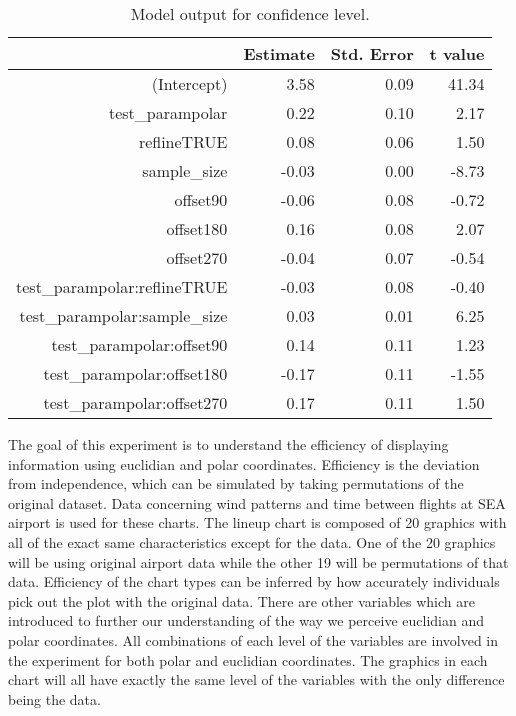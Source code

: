 \begin{table}[ht]
\begin{center}
\resizebox{\linewidth}{!} {
\begin{tabular}{rrrr}
  \hline
 & Estimate & Std. Error & t value \\ 
  \hline
(Intercept) & 3.58 & 0.09 & 41.34 \\ 
  test\_parampolar & 0.22 & 0.10 & 2.17 \\ 
  reflineTRUE & 0.08 & 0.06 & 1.50 \\ 
  sample\_size & -0.03 & 0.00 & -8.73 \\ 
  offset90 & -0.06 & 0.08 & -0.72 \\ 
  offset180 & 0.16 & 0.08 & 2.07 \\ 
  offset270 & -0.04 & 0.07 & -0.54 \\ 
  test\_parampolar:reflineTRUE & -0.03 & 0.08 & -0.40 \\ 
  test\_parampolar:sample\_size & 0.03 & 0.01 & 6.25 \\ 
  test\_parampolar:offset90 & 0.14 & 0.11 & 1.23 \\ 
  test\_parampolar:offset180 & -0.17 & 0.11 & -1.55 \\ 
  test\_parampolar:offset270 & 0.17 & 0.11 & 1.50 \\ 
   \hline
\end{tabular}
}
\end{center}
\caption{\label{tbl:confidence} Model output for confidence level. }
\end{table}



The goal of this experiment is to understand the efficiency of displaying information using euclidian and polar coordinates. Efficiency is the deviation from independence, which can be simulated by taking permutations of the original dataset. Data concerning wind patterns and time between flights at SEA airport is used for these charts. The lineup chart is composed of 20 graphics with all of the exact same characteristics except for the data. One of the 20 graphics will be using original airport data while the other 19 will be permutations of that data. Efficiency of the chart types can be inferred by how accurately individuals pick out the plot with the original data. There are other variables which are introduced to further our understanding of the way we perceive euclidian and polar coordinates. All combinations of each level of the variables are involved in the experiment for both polar and euclidian coordinates. The graphics in each chart will all have exactly the same level of the variables with the only difference being the data. 

